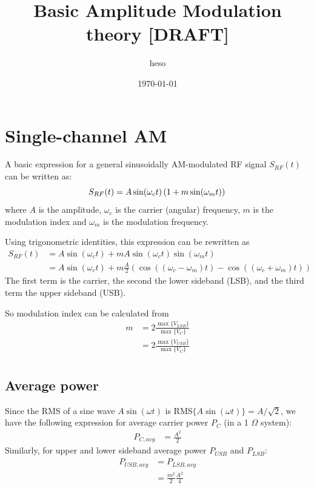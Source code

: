 \documentclass[12pt]{article}
\title{Basic Amplitude Modulation theory [DRAFT]}
\author{heso}
\date{\today}
\begin{document}
\maketitle

\section{Single-channel AM}

A basic expression for a general sinusoidally AM-modulated RF signal $S_{RF}(t)$ can be written as:
\begin{equation}
S_{RF}(t)  = A \sin(\omega_c t) \left( 1 + m \sin(\omega_m t) \right) \\
\end{equation}
where $A$ is the amplitude, $\omega_c$ is the carrier (angular) frequency, $m$ is the modulation index and $\omega_m$ is the modulation frequency.

Using trigonometric identities, this expression can be rewritten as
\begin{equation}
\begin{aligned}
S_{RF}(t) & = A \sin(\omega_c t) + m A \sin(\omega_c t) \sin(\omega_m t) \\
      & = A \sin(\omega_c t) + 
    m \frac{A}{2} ( \cos((\omega_c - \omega_m)t) - \cos((\omega_c + \omega_m)t) )
\end{aligned}
\end{equation}
The first term is the carrier, the second the lower sideband (LSB), and the third term the upper sideband (USB).

So modulation index can be calculated from 
\begin{equation}
\begin{aligned}
m &= 2 \frac{\max{ \{ V_{LSB} \} }}{\max{ \{ V_C \} }} \\
&= 2 \frac{\max{ \{ V_{USB} \} }}{\max{ \{ V_C \} }} \\
\end{aligned}
\end{equation}


\subsection{Average power}

Since the RMS of a sine wave $ A \sin(\omega t)$ is RMS$\{A\sin(\omega t)\} = A / \sqrt{2}$, we have the following expression for average carrier power $P_C$ (in a 1 $\Omega$ system):
\begin{equation}
\begin{aligned}
P_{C,avg} & = \frac{A^2}{2}
\end{aligned}
\end{equation}
Similarly, for upper and lower sideband average power $P_{USB}$ and $P_{LSB}$: 
\begin{equation}
\begin{aligned}
P_{USB,avg} & = P_{LSB,avg} \\
      & = \frac{m^2}{2} \frac{A^2}{4}
\end{aligned}
\end{equation}
\end{document}

